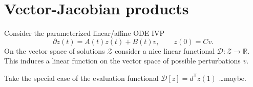 \documentclass{article}
\begin{document}
\section{Vector-Jacobian products}
Consider the parameterized linear/affine ODE IVP
\begin{equation}
    \partial z(t) = A(t) z(t) + B(t) v, \qquad z(0) = C v.
\end{equation}
On the vector space of solutions $\mathcal{Z}$ consider a nice linear
functional $\mathcal{D}: \mathcal{Z} \to \mathbb{R}$. This induces a linear
function on the vector space of possible perturbations $v$.

Take the special case of the evaluation functional $\mathcal{D}[z] =
d^\mathsf{T} z(1)$ \ldots maybe.
\end{document}

